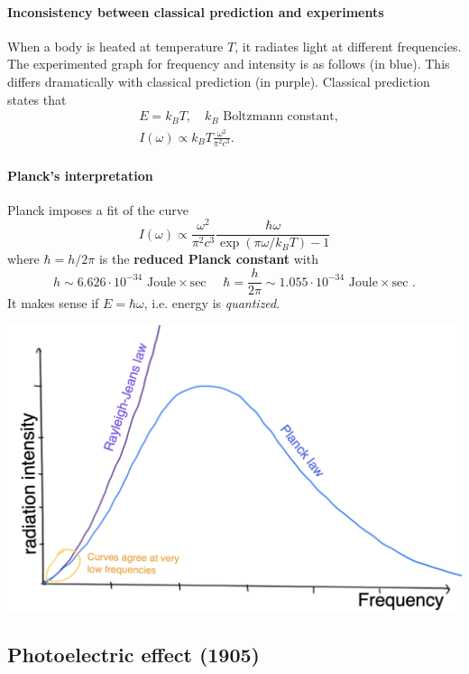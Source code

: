 \documentclass[a4paper]{article}
\begin{document}
\paragraph{Inconsistency between classical prediction and experiments}
When a body is heated at temperature $T$, it radiates light at different frequencies. The experimented graph for frequency and intensity is as follows (in blue). This differs dramatically with classical prediction (in purple). Classical prediction states that 
\begin{align*}
    &E = k_B T, \quad k_B \text{ Boltzmann constant},\\ 
    &I(\omega) \propto k_B T \frac{\omega^2}{\pi^2 c^3}. 
\end{align*}
\paragraph{Planck's interpretation}
Planck imposes a fit of the curve 
\[
    I(\omega) \propto \frac{\omega^2}{\pi^2c^3} \frac{\hbar \omega}{\exp(\pi \omega/k_B T)-1}
\]
where $ \hbar = h/2\pi $ is the \textbf{reduced Planck constant} with 
\[
    h \sim 6.626 \cdot 10^{-34} \text { Joule} \times \text {sec } \quad \hbar=\frac{h}{2 \pi} \sim 1.055 \cdot 10^{-34} \text { Joule} \times \text {sec }. 
\]
It makes sense if $ E = \hbar \omega $, i.e. energy is \textit{quantized}.
\begin{center}
    \includegraphics[scale=0.15]{qm1.png}
\end{center}

\subsection{Photoelectric effect (1905)}
\end{document}
